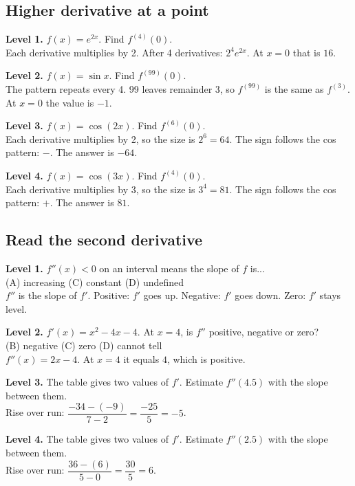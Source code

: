 \documentclass[11pt]{article}
\begin{document}
\subsection*{Higher derivative at a point}
\noindent\textbf{Level 1.} $f(x)=e^{2x}$. Find $f^{(4)}(0)$.\\  \quad Each derivative multiplies by 2. After 4 derivatives: $2^{4}e^{2x}$. At $x=0$ that is $16$.\par\medskip
\noindent\textbf{Level 2.} $f(x)=\sin x$. Find $f^{(99)}(0)$.\\  \quad The pattern repeats every 4. 99 leaves remainder 3, so $f^{(99)}$ is the same as $f^{(3)}$. At $x=0$ the value is $-1$.\par\medskip
\noindent\textbf{Level 3.} $f(x)=\cos(2x)$. Find $f^{(6)}(0)$.\\  \quad Each derivative multiplies by 2, so the size is $2^{6}=64$. The sign follows the cos pattern: $-$. The answer is $-64$.\par\medskip
\noindent\textbf{Level 4.} $f(x)=\cos(3x)$. Find $f^{(4)}(0)$.\\  \quad Each derivative multiplies by 3, so the size is $3^{4}=81$. The sign follows the cos pattern: $+$. The answer is $81$.\par\medskip
\subsection*{Read the second derivative}
\noindent\textbf{Level 1.} $f''(x)<0$ on an interval means the slope of $f$ is...\\ (A) increasing \quad {} \quad (C) constant \quad (D) undefined\\  \quad $f''$ is the slope of $f'$. Positive: $f'$ goes up. Negative: $f'$ goes down. Zero: $f'$ stays level.\par\medskip
\noindent\textbf{Level 2.} $f'(x)=x^{2}-4x-4$. At $x=4$, is $f''$ positive, negative or zero?\\  \quad (B) negative \quad (C) zero \quad (D) cannot tell\\  \quad $f''(x)=2x-4$. At $x=4$ it equals $4$, which is positive.\par\medskip
\noindent\textbf{Level 3.} The table gives two values of $f'$. Estimate $f''(4.5)$ with the slope between them.\\  \quad Rise over run: $\dfrac{-34-(-9)}{7-2}=\dfrac{-25}{5}=-5$.\par\medskip
\noindent\textbf{Level 4.} The table gives two values of $f'$. Estimate $f''(2.5)$ with the slope between them.\\  \quad Rise over run: $\dfrac{36-(6)}{5-0}=\dfrac{30}{5}=6$.\par\medskip
\end{document}

